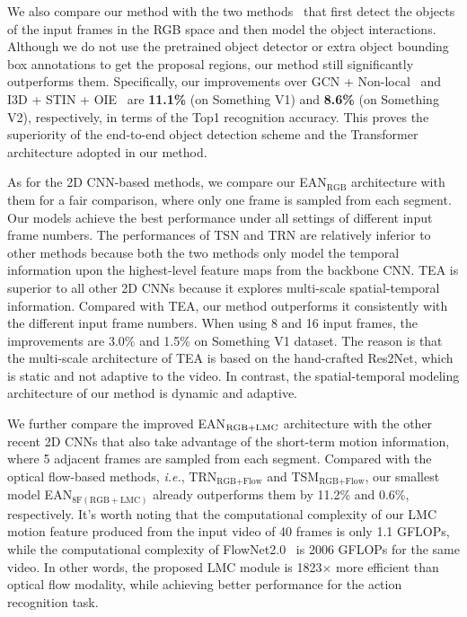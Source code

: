 \begin{table*}[!th]
	\label{tab_k400_sota}
\end{table*}


We also compare our method with the two methods~\cite{materzynska2020something}\cite{wang2018videos} that first detect the objects of the input frames in the RGB space and then model the object interactions.
Although we do not use the pretrained object detector or extra object bounding box annotations to get the proposal regions, our method still significantly outperforms them.
Specifically, our improvements over GCN + Non-local~\cite{wang2018videos} and I3D + STIN + OIE~\cite{materzynska2020something} are \textbf{11.1\%} (on Something V1) and \textbf{8.6\%} (on Something V2), respectively, in terms of the Top1 recognition accuracy.
This proves the superiority of the end-to-end object detection scheme and the Transformer architecture adopted in our method.


As for the 2D CNN-based methods, we compare our EAN$_{\operatorname{RGB}}$ architecture with them for a fair comparison, where only one frame is sampled from each segment.
Our models achieve the best performance under all settings of different input frame numbers.
The performances of TSN and TRN are relatively inferior to other methods because both the two methods only model the temporal information upon the highest-level feature maps from the backbone CNN. TEA is superior to all other 2D CNNs because it explores multi-scale spatial-temporal information. Compared with TEA, our method outperforms it consistently with the different input frame numbers. When using 8 and 16 input frames, the improvements are 3.0\% and 1.5\% on Something V1 dataset. The reason is that the multi-scale architecture of TEA is based on the hand-crafted Res2Net, which is static and not adaptive to the video. In contrast, the spatial-temporal modeling architecture of our method is dynamic and adaptive.





We further compare the improved EAN$_\textnormal{RGB+LMC}$ architecture with the other recent 2D CNNs that also take advantage of the short-term motion information, where 5 adjacent frames are sampled from each segment. Compared with the optical flow-based methods, \textit{i.e.}, TRN$_{\operatorname{RGB+Flow}}$ and TSM$_{\operatorname{RGB+Flow}}$, 
our smallest model EAN$_{\operatorname{8F(RGB+LMC)}}$ already outperforms them by 11.2\% and 0.6\%, respectively. It's worth noting that the computational complexity of our LMC motion feature produced from the input video of 40 frames is only 1.1 GFLOPs, while the computational complexity of FlowNet2.0~\cite{ilg2017flownet} is 2006 GFLOPs for the same video.
In other words, the proposed LMC module is 1823$\times$ more efficient than optical flow modality, while achieving better performance for the action recognition task.

